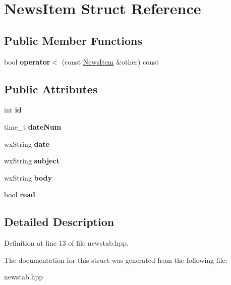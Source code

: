 \hypertarget{struct_news_item}{\section{News\-Item Struct Reference}
\label{struct_news_item}
}
\subsection*{Public Member Functions}
\begin{DoxyCompactItemize}
\item 
\hypertarget{struct_news_item_a01879804aa536b4ff202dc1038c9acdf}{bool {\bfseries operator$<$} (const \hyperlink{struct_news_item}{News\-Item} \&other) const }\label{struct_news_item_a01879804aa536b4ff202dc1038c9acdf}

\end{DoxyCompactItemize}
\subsection*{Public Attributes}
\begin{DoxyCompactItemize}
\item 
\hypertarget{struct_news_item_a51cbbdc6566ae3c36d928ca479c7d546}{int {\bfseries id}}\label{struct_news_item_a51cbbdc6566ae3c36d928ca479c7d546}

\item 
\hypertarget{struct_news_item_abcffbf67b6350249e1a0fd89ac3adfb2}{time\-\_\-t {\bfseries date\-Num}}\label{struct_news_item_abcffbf67b6350249e1a0fd89ac3adfb2}

\item 
\hypertarget{struct_news_item_abea175dc61f718ee32dc487e82f7e755}{wx\-String {\bfseries date}}\label{struct_news_item_abea175dc61f718ee32dc487e82f7e755}

\item 
\hypertarget{struct_news_item_a11b5e1611209408a8d87503343fb9249}{wx\-String {\bfseries subject}}\label{struct_news_item_a11b5e1611209408a8d87503343fb9249}

\item 
\hypertarget{struct_news_item_aef9acd681d7b2aa956b45f56d409e359}{wx\-String {\bfseries body}}\label{struct_news_item_aef9acd681d7b2aa956b45f56d409e359}

\item 
\hypertarget{struct_news_item_a39d9e4e9a664935156b66995b5adac38}{bool {\bfseries read}}\label{struct_news_item_a39d9e4e9a664935156b66995b5adac38}

\end{DoxyCompactItemize}


\subsection{Detailed Description}


Definition at line 13 of file newstab.\-hpp.



The documentation for this struct was generated from the following file\-:\begin{DoxyCompactItemize}
\item 
newstab.\-hpp\end{DoxyCompactItemize}
